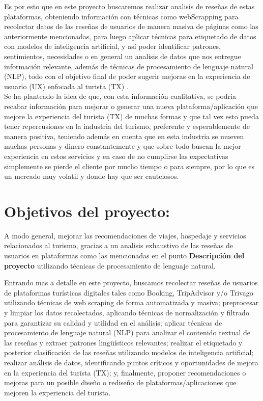 \documentclass[12pt, letterpaper]{report} %
\begin{document}
    Es por esto que en este proyecto buscaremos realizar analisis de reseñas de estas plataformas, 
    obteniendo información con técnicas como webScrapping para recolectar datos de las reseñas de usuarios de 
    manera masiva de páginas como las anteriormente mencionadas, para luego aplicar técnicas para etiquetado 
    de datos con modelos de inteligencia artificial, y así poder identificar patrones, sentimientos, necesidades 
    o en general un analisis de datos que nos entregue información relevante, además de técnicas de procesamiento de lenguaje natural (NLP), todo con el objetivo final de poder sugerir mejoras en la 
    experiencia de usuario (UX) enfocada al turista (TX) .\\

    Se ha planteado la idea de que, con esta información cualitativa, se podria recabar información para 
    mejorar o generar una nueva plataforma/aplicación que mejore la experiencia del turista (TX) de muchas formas y que tal vez esto
    pueda tener repercusiones en la industria del turismo, preferente y esperablemente de manera positiva, teniendo además en cuenta que en esta industria se mueven muchas personas y dinero 
    constantemente y que sobre todo buscan la mejor experiencia en estos servicios y en caso de no cumplirse las expectativas simplemente se pierde 
    el cliente por mucho tiempo o para siempre, por lo que es un mercado muy volatil y donde hay que ser cautelosos.

    \section*{Objetivos del proyecto:}
    
    A modo general, mejorar las recomendaciones de viajes, hospedaje y servicios relacionados al turismo, gracias a un 
    analisis exhaustivo de las reseñas de usuarios en plataformas como las mencionadas en el punto 
    \textbf{Descripción del proyecto} utilizando técnicas de procesamiento de lenguaje natural.

    Entrando mas a detalle en este proyecto, buscamos recolectar reseñas de usuarios de plataformas 
    turísticas digitales tales como Booking, TripAdvisor y/o Trivago utilizando técnicas de web 
    scraping de forma automatizada y masiva; preprocesar y limpiar los datos recolectados, aplicando 
    técnicas de normalización y filtrado para garantizar su calidad y utilidad en el análisis; 
    aplicar técnicas de procesamiento de lenguaje natural (NLP) para analizar el contenido textual 
    de las reseñas y extraer patrones lingüísticos relevantes; realizar el etiquetado y posterior 
    clasificación de las reseñas utilizando modelos de inteligencia artificial; realizar análisis de datos,
    identificando puntos críticos y oportunidades de mejora en la experiencia del turista (TX); y, 
    finalmente, proponer recomendaciones o mejoras para un posible diseño o rediseño de 
    plataformas/aplicaciones que mejoren la experiencia del turista.
\end{document}
